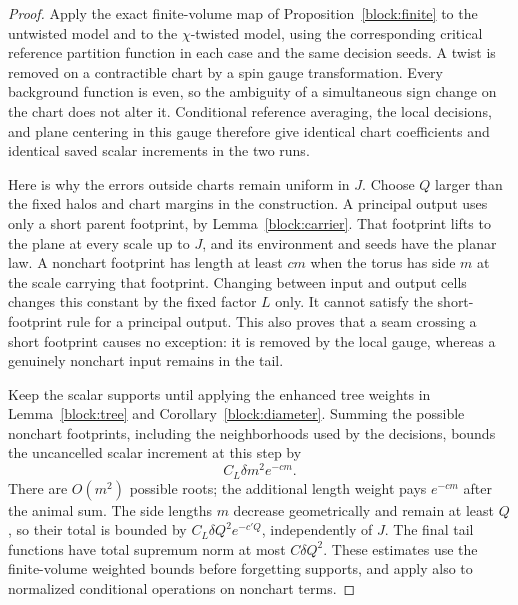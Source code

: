 \begin{proof}
Apply the exact finite-volume map of Proposition~\ref{block:finite}
to the untwisted model and to the $\chi$-twisted model, using the
corresponding critical reference partition function in each case and
the same decision seeds.  A twist is removed on a contractible chart
by a spin gauge transformation.  Every background function is even,
so the ambiguity of a simultaneous sign change on the chart does not
alter it.  Conditional reference averaging, the local decisions, and
plane centering in this gauge therefore give identical chart
coefficients and identical saved scalar increments in the two runs.

Here is why the errors outside charts remain uniform in $J$.  Choose
$Q$ larger than the fixed halos and chart margins in the construction.
A principal output uses only a short parent footprint, by
Lemma~\ref{block:carrier}.  That footprint lifts to the plane at
every scale up to $J$, and its environment and seeds have the planar
law.  A nonchart footprint has length at least $cm$ when the torus has
side $m$ at the scale carrying that footprint.  Changing between input
and output cells changes this constant by the fixed factor $L$ only.
It cannot satisfy the short-footprint rule
for a principal output.  This also proves that a seam crossing a
short footprint causes no exception: it is removed by the local
gauge, whereas a genuinely nonchart input remains in the tail.

Keep the scalar supports until applying the enhanced tree weights in
Lemma~\ref{block:tree} and Corollary~\ref{block:diameter}.
Summing the possible nonchart footprints,
including the neighborhoods used by the decisions, bounds the
uncancelled scalar increment at this step by
\[
 C_L\delta m^2e^{-cm}.
\]
There are $O(m^2)$ possible roots; the additional length weight pays
$e^{-cm}$ after the animal sum.  The side lengths $m$ decrease
geometrically and remain at least $Q$, so their total is bounded by
$C_L\delta Q^2e^{-c'Q}$, independently of $J$.  The final tail functions
have total supremum norm at most $C\delta Q^2$.  These estimates use
the finite-volume weighted bounds before forgetting supports, and
apply also to normalized conditional operations on nonchart terms.


\end{proof}
